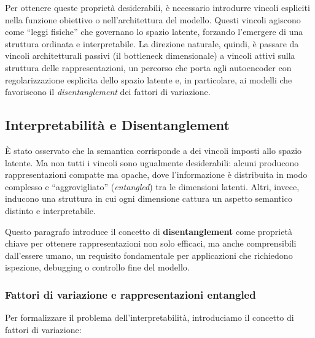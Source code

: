 Per ottenere queste proprietà desiderabili, è necessario introdurre vincoli espliciti nella funzione obiettivo o nell'architettura del modello. Questi vincoli agiscono come ``leggi fisiche'' che governano lo spazio latente, forzando l'emergere di una struttura ordinata e interpretabile.
La direzione naturale, quindi, è passare da vincoli architetturali passivi (il bottleneck dimensionale) a vincoli attivi sulla struttura delle 
rappresentazioni, un percorso che porta agli autoencoder con regolarizzazione esplicita dello spazio latente e, in particolare, ai modelli che favoriscono il \textit{disentanglement} dei fattori di variazione.



\subsection{Interpretabilità e Disentanglement}
\label{sec:interpretabilita_disentanglement}

È stato osservato che la semantica corrisponde a dei
vincoli imposti allo spazio latente. Ma non tutti i vincoli sono ugualmente desiderabili: alcuni producono rappresentazioni compatte ma opache, dove l'informazione è distribuita in modo complesso e ``aggrovigliato'' (\textit{entangled}) tra le dimensioni latenti. Altri, invece, inducono una struttura in cui ogni dimensione cattura un aspetto semantico distinto e interpretabile.

Questo paragrafo introduce il concetto di \textbf{disentanglement} come proprietà chiave per ottenere rappresentazioni non solo efficaci, ma anche comprensibili dall'essere 
umano, un requisito fondamentale per applicazioni che richiedono ispezione, debugging o controllo fine del modello.

\subsubsection{Fattori di variazione e rappresentazioni entangled}

Per formalizzare il problema dell'interpretabilità, introduciamo il concetto di fattori di variazione:

